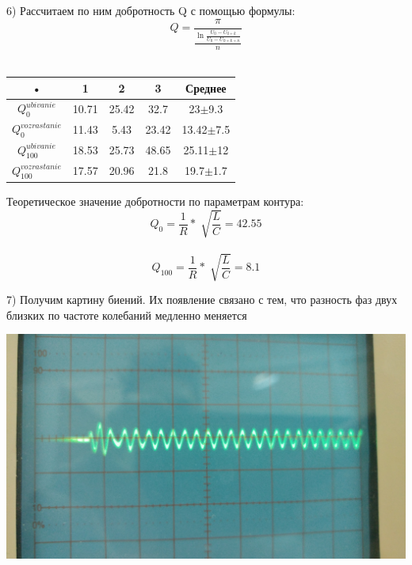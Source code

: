 \documentclass[a4paper,12pt]{article} %
\begin{document}
6) Рассчитаем по ним добротность Q с помощью формулы:\\
\begin{equation} 
Q=\frac  {\pi}   {   \frac{\ln{\frac{U_0-U_{0+k}}{U_0-U_{0+k+n}}}}{n}    }    
\end{equation}
\\
\begin{center}

\begin{tabular}{|c|c|c|c|c|}
\hline 
• & 1 & 2 & 3 & Среднее \\ 
\hline 
$Q^{ubivanie}_0$ & 10.71 & 25.42 & 32.7 & 23$\pm$9.3 \\ 
\hline 
$Q^{vozrastanie}_0$ & 11.43 & 5.43 & 23.42 & 13.42$\pm$7.5 \\ 
\hline 
$Q^{ubivanie}_{100}$ & 18.53 & 25.73 & 48.65 & 25.11$\pm$12\\ 
\hline 
$Q^{vozrastanie}_{100}$ & 17.57 & 20.96 & 21.8 & 19.7$\pm$1.7 \\ 
\hline 
\end{tabular}  

\end{center}
 Теоретическое значение добротности по параметрам контура: \\
\begin{equation}
Q_0=\frac{1}{R} *\sqrt[] {\frac{L}{C}}=42.55             
\end{equation}\\
\begin{equation}
Q_{100}=\frac{1}{R} *\sqrt[] {\frac{L}{C}}=8.1
\end{equation}

7) Получим картину биений. Их появление связано с тем, что разность фаз двух близких по частоте колебаний медленно меняется
\begin{center}

\includegraphics[scale=0.1]{bi}\\
\end{center}
 
\end{document}

